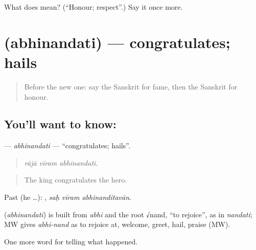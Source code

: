 \begin{tcolorbox}[breakable,colback=teal!4,colframe=teal!35!black,title={Before you move on}]
What does  mean? (\textquotedblleft{}Honour; respect\textquotedblright{}.) Say it once more.
\end{tcolorbox}
\section[\texorpdfstring{\sk{अभिनन्दति} (abhinandati)}{अभिनन्दति (abhinandati)}]{ (abhinandati) — congratulates; hails}

\label{lesson:SA-C314-abhinandati}



\begin{quote}
Before the new one: say the Sanskrit for fame, then the Sanskrit for honour.
\end{quote}

\subsection*{You'll want to know: }
\textbf{} — \emph{abhinandati} — \textquotedblleft{}congratulates; hails\textquotedblright{}.

\begin{quote}
  
\end{quote}

\begin{quote}
\emph{rājā vīram abhinandati.}
\end{quote}

\begin{quote}
The king congratulates the hero.
\end{quote}

Past (he …):   , \emph{saḥ vīram abhinanditavān}.

\begin{cousinweb}
\textbf{} (\emph{abhinandati}) is built from \emph{abhi} and the root √nand, \textquotedblleft{}to rejoice\textquotedblright{}, as in \emph{nandati}; MW gives \emph{abhi-nand} as to rejoice at, welcome, greet, hail, praise (MW).
\end{cousinweb}

\begin{grammarlens}[title={What you've built}]
One more word for telling what happened.
\end{grammarlens}


